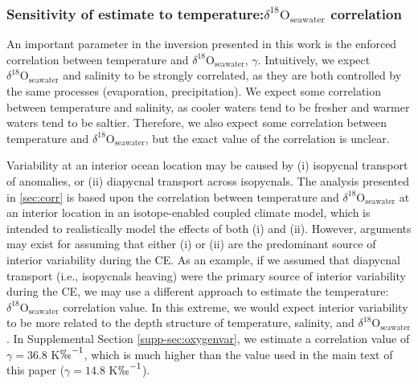 \documentclass[draft]{agujournal2019}
\begin{document}
\subsubsection{Sensitivity of estimate to temperature:$\delta^{18}\mathrm{O}_{\mathrm{seawater}}$ correlation \label{sec:gammasens}}
An important parameter in the inversion presented in this work is the enforced correlation between temperature and $\delta^{18}\mathrm{O}_{\mathrm{seawater}}$, $\gamma$. Intuitively, we expect $\delta^{18}\mathrm{O}_{\mathrm{seawater}}$ and salinity to be strongly correlated, as they are both controlled by the same processes (evaporation, precipitation). We expect some correlation between temperature and salinity, as cooler waters tend to be fresher and warmer waters tend to be saltier. Therefore, we also expect some correlation between temperature and $\delta^{18}\mathrm{O}_{\mathrm{seawater}}$, but the exact value of the correlation is unclear.

Variability at an interior ocean location may be caused by (i) isopycnal transport of anomalies, or (ii) diapycnal transport across isopycnals. The analysis presented in \ref{sec:corr} is based upon the correlation between temperature and $\delta^{18}\mathrm{O}_{\mathrm{seawater}}$ at an interior location in an isotope-enabled coupled climate model, which is intended to realistically model the effects of both (i) and (ii). However, arguments may exist for assuming that either (i) or (ii) are the predominant source of interior variability during the CE. As an example, if we assumed that diapycnal transport (i.e., isopycnals heaving) were the primary source of interior variability during the CE, we may use a different approach to estimate the temperature:$\delta^{18}\mathrm{O}_{\mathrm{seawater}}$ correlation value. In this extreme, we would expect interior variability to be more related to the depth structure of temperature, salinity, and $\delta^{18}\mathrm{O}_{\mathrm{seawater}}$. In Supplemental Section \ref{supp-sec:oxygenvar}, we estimate a correlation value of $\gamma = 36.8$ K$\permil^{-1}$, which is much higher than the value used in the main text of this paper ($\gamma = 14.8$ K$\permil^{-1}$). 
\end{document}
